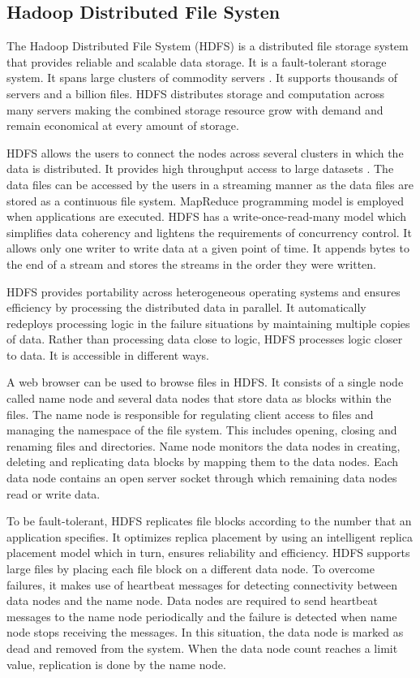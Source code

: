 \documentclass[9pt,twocolumn,twoside]{../../styles/osajnl}
\begin{document}
\subsection{Hadoop Distributed File Systen}

The Hadoop Distributed File System (HDFS) is a distributed file
storage system that provides reliable and scalable data storage. It is
a fault-tolerant storage system. It spans large clusters of commodity
servers \cite{hdfsHorton}. It supports thousands of servers and a
billion files. HDFS distributes storage and computation across many
servers making the combined storage resource grow with demand and
remain economical at every amount of storage.

HDFS allows the users to connect the nodes across several clusters in
which the data is distributed. It provides high throughput access to
large datasets \cite{hdfsIbm}. The data files can be accessed by the
users in a streaming manner as the data files are stored as a
continuous file system. MapReduce programming model is employed when
applications are executed. HDFS has a write-once-read-many model which
simplifies data coherency and lightens the requirements of concurrency
control. It allows only one writer to write data at a given point of
time. It appends bytes to the end of a stream and stores the streams
in the order they were written.

HDFS provides portability across heterogeneous operating systems and
ensures efficiency by processing the distributed data in parallel. It
automatically redeploys processing logic in the failure situations by
maintaining multiple copies of data. Rather than processing data close
to logic, HDFS processes logic closer to data. It is accessible in
different ways.

A web browser can be used to browse files in HDFS. It consists of a
single node called name node and several data nodes that store data as
blocks within the files. The name node is responsible for regulating
client access to files and managing the namespace of the file
system. This includes opening, closing and renaming files and
directories. Name node monitors the data nodes in creating, deleting
and replicating data blocks by mapping them to the data nodes. Each
data node contains an open server socket through which remaining data
nodes read or write data.

To be fault-tolerant, HDFS replicates file blocks according to the
number that an application specifies. It optimizes replica placement
by using an intelligent replica placement model which in turn, ensures
reliability and efficiency. HDFS supports large files by placing each
file block on a different data node. To overcome failures, it makes
use of heartbeat messages for detecting connectivity between data
nodes and the name node. Data nodes are required to send heartbeat
messages to the name node periodically and the failure is detected
when name node stops receiving the messages. In this situation, the
data node is marked as dead and removed from the system. When the data
node count reaches a limit value, replication is done by the name
node.
\end{document}
